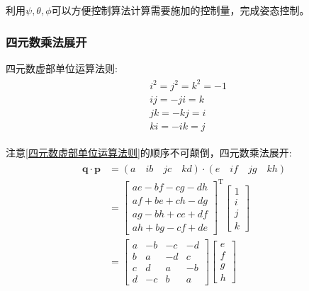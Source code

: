 \documentclass[12pt,a4paper]{article}
\renewcommand{\citep}[1]{\textsuperscript{\cite{#1}}}
\begin{document}
利用$\psi,\theta,\phi$可以方便控制算法计算需要施加的控制量，完成姿态控制。

\subsubsection{四元数乘法展开}
四元数虚部单位运算法则:
\begin{eqnarray}\label{四元数虚部单位运算法则}
    \begin{split}
        &i^2=j^2=k^2=-1 \\
        &ij=-ji=k \\
        &jk=-kj=i \\
        &ki=-ik=j
    \end{split}
\end{eqnarray} 

注意\ref{四元数虚部单位运算法则}的顺序不可颠倒，四元数乘法展开\citep{捷联惯导航}: 
\begin{eqnarray}\label{四元数乘法展开}
    \begin{split}
        \bm{q}\cdot \bm{p}
        &=(a\quad ib\quad jc\quad kd)\cdot(e\quad if\quad jg\quad kh) \\
        &=\left[\begin{matrix}
        ae-bf-cg-dh \\
        af+be+ch-dg \\
        ag-bh+ce+df \\
        ah+bg-cf+de
        \end{matrix}\right]^\mathrm{T}
        \left[\begin{matrix}
                1 \\ i \\ j \\ k
        \end{matrix}\right] \\
        &=\left[\begin{matrix}
        a &-b &-c &-d \\
        b & a &-d & c \\
        c & d & a &-b \\
        d &-c & b & a
        \end{matrix}\right]
        \left[\begin{matrix} e \\ f \\ g \\ h \end{matrix}\right]
    \end{split}
\end{eqnarray} 
\end{document}
